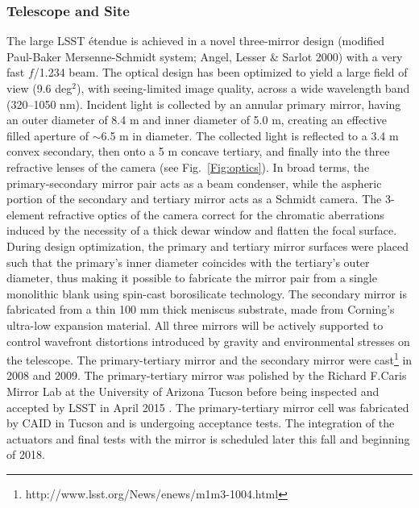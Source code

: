 \documentclass{emulateapj}
\begin{document}
\subsubsection{ Telescope and Site}

The large LSST \'etendue is achieved in a novel three-mirror design (modified
Paul-Baker Mersenne-Schmidt system; Angel, Lesser \& Sarlot 2000) with a very fast $f$/1.234 beam. The optical 
design has been optimized to yield a large field of view (9.6 deg$^2$), 
with seeing-limited image quality, across a wide wavelength band (320--1050
nm). Incident light is collected by an annular primary mirror, having
an outer diameter of 8.4 m and inner diameter of 5.0 m, creating an effective filled aperture of 
$\sim$6.5 m in diameter. The collected light is reflected to a 3.4 m convex secondary, then onto
a 5 m concave tertiary, and finally  into the three refractive lenses of the camera (see Fig.~\ref{Fig:optics}).  
In broad terms, the primary-secondary mirror pair acts as a beam condenser, while the aspheric portion of 
the secondary and tertiary mirror acts as a Schmidt camera.  The 3-element refractive optics of the camera
correct for the chromatic aberrations induced by the necessity of a thick dewar window and flatten the
focal surface.  During design optimization, the primary and tertiary mirror surfaces were placed such that the primary's 
inner diameter coincides with the tertiary's outer diameter, thus making it possible to fabricate the mirror pair from a 
single monolithic blank using spin-cast borosilicate technology. The secondary mirror is fabricated from 
a thin 100 mm thick meniscus substrate, made from Corning's ultra-low expansion material. All 
three mirrors will be actively supported to control wavefront distortions 
introduced by gravity and environmental stresses on the telescope. 
The primary-tertiary mirror and the secondary mirror were 
cast\footnote{http://www.lsst.org/News/enews/m1m3-1004.html}  in 2008
and 2009.  The primary-tertiary mirror was polished by the Richard F.Caris Mirror Lab at the University of Arizona Tucson before being inspected and accepted by LSST in April 2015 \cite{Araujo16}. The  primary-tertiary mirror cell was fabricated by CAID in Tucson and is undergoing acceptance tests. The integration of the actuators and final tests with the mirror is scheduled later this fall and beginning of 2018. 
 
\end{document}
